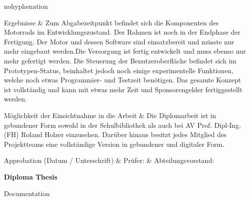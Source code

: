 {\begin{hyphenrules}{nohyphenation}
\begin{center}
			\begin{mytable}
				Ergebnisse & Zum Abgabezeitpunkt befindet sich die Komponenten des Motorrads im Entwicklungszustand. Der Rahmen ist noch in der Endphase der Fertigung. Der Motor und dessen Software sind einsatzbereit und müsste nur mehr eingebaut werden.Die Versorgung ist fertig entwickelt und muss ebenso nur mehr gefertigt werden. Die Steuerung der Benutzeroberfläche befindet sich im Prototypen-Status, beinhaltet jedoch noch einige experimentelle Funktionen, welche noch etwas Programmier- und Testzeit benötigen. Das gesamte Konzept ist vollständig und kann mit etwas mehr Zeit und Sponsorengelder fertiggestellt werden. \\
			\end{mytable}\vskip-0.42cm
			\begin{mytable}
				Möglichkeit der Einsichtnahme in die Arbeit & Die Diplomarbeit ist in gebundener Form sowohl in der Schulbibliothek als auch bei AV Prof. Dipl-Ing. (FH) Roland Holzer einzusehen. Darüber hinaus besitzt jedes Mitglied des Projektteams eine vollständige Version in gebundener und digitaler Form.\\
			\end{mytable}\vskip-0.42cm
			\begin{mytable}[{|X[0.995,c]|X[1,m]|X[1,m]|}]
				Approbation \newline (Datum / Unterschrift) &
				\hbox{\footnotesize{Prüfer:}} &
				\hbox{\footnotesize{Abteilungsvorstand:}} \\
				\hline
			\end{mytable}
		\end{center}
	\end{hyphenrules}

\newpage

	\centering
\begin{huge}
	\textbf{Diploma Thesis}
\end{huge}

\begin{large}
	 Documentation
\end{large}

}
